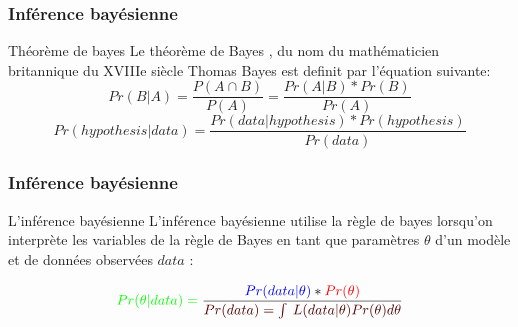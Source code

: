 \documentclass[aspectratio=169,professionalfonts, 12pt]{beamer}
\begin{document}
\begin{frame}
  \frametitle{Inférence bayésienne}
  \justifying 
  \begin{minipage}{\textwidth}
  \begin{block}{Théorème de bayes}
    Le théorème de Bayes , du nom du mathématicien britannique du XVIIIe siècle Thomas Bayes est definit par l'équation suivante:   
    \begin{equation}
      Pr(B|A) = \frac{P(A\cap B)}{P(A)} = \frac{Pr(A|B)*Pr(B)}{Pr(A)}
      \label{theoreme_bayes}
    \end{equation} 
    \begin{equation}
      Pr(hypothesis|data) = \frac{Pr(data|hypothesis)*Pr(hypothesis)}{Pr(data)}
      \label{theoreme_bayes2}
    \end{equation}
  \end{block}
  \end{minipage} 
\end{frame}


\begin{frame}
  \frametitle{Inférence bayésienne}
  \justifying 
  \begin{minipage}{\textwidth}
  \begin{block}{L'inférence bayésienne}
    L'inférence bayésienne utilise la règle de bayes lorsqu’on interprète les variables de la règle de Bayes en tant que paramètres \(\displaystyle \theta \) d'un modèle et de données observées \(\displaystyle data \) : 
  \end{block}
  \end{minipage}
  \begin{minipage}{\textwidth}
    \centering 
    \begin{equation}
      \color{green} Pr(\theta|data) = \color{black} \frac{ \color{blue} Pr(data|\theta)\color{black} * \color{red}Pr(\theta)}{ \color{blueforest} Pr(data) =  \int_{}^{}  \,L(data|\theta)Pr(\theta)d\theta }
      \label{theoreme_bayes3}
    \end{equation}
  \end{minipage}
\end{frame}
\end{document}
